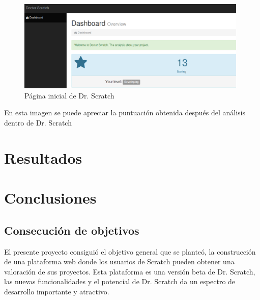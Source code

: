 \documentclass[a4paper, 12pt]{book}
\begin{document}
 \begin{figure}
		\graphicspath{{img/}}
    \includegraphics[bb=0 0 800 600, width=11cm, keepaspectratio]{puntuacion.png}
		\caption{Página inicial de Dr. Scratch}
    \label{figura:foro_hilos}
 \end{figure} 

En esta imagen se puede apreciar la puntuación obtenida después del análisis dentro
de Dr. Scratch



\cleardoublepage
\chapter{Resultados}



\cleardoublepage
\chapter{Conclusiones}
\label{chap:conclusiones}


\section{Consecución de objetivos}
\label{sec:consecucion-objetivos}

El presente proyecto consiguió el objetivo general que se planteó, la 
construcción de una plataforma web donde los usuarios de Scratch pueden 
obtener una valoración de sus proyectos. Esta plataforma es una versión
beta de Dr. Scratch, las nuevas funcionalidades y el potencial de Dr. 
Scratch da un espectro de desarrollo importante y atractivo.
\end{document}
